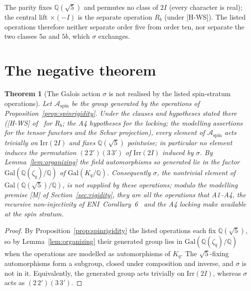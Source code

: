 \documentclass[11pt]{article}
\newtheorem{theorem}{Theorem}
\theoremstyle{definition}
\theoremstyle{remark}
\newcommand{\Gal}{\mathrm{Gal}}
\begin{document}
    The parity fixes $\mathbb{Q}(\sqrt{5})$ and permutes no class of $2I$ (every character is real); the central lift
    $\times(-I)$ is the separate operation $R_b$ (under [H-WS]).
    The listed operations therefore neither separate order five from order ten, nor separate the two classes $5a$ and $5b$, which
    $\sigma$ exchanges.

  \section{The negative theorem}
    \label{sec:negative}

    \begin{theorem}[The Galois action $\sigma$ is not realised by the listed spin-stratum operations]
      \label{thm:negative}
      Let $\mathcal{A}_{\mathrm{spin}}$ be the group generated by the operations of
      Proposition~\ref{prop:spinrigidity}.
      Under the clauses and hypotheses stated there ([H-WS] of~\cite{Beau2026q11of} for $R_b$; the A4 hypotheses for the
      locking; the modelling assertions for the tensor functors and the Schur projection), every element of
      $\mathcal{A}_{\mathrm{spin}}$ acts trivially on $\mathrm{Irr}(2I)$ and fixes $\mathbb{Q}(\sqrt{5})$ pointwise; in
      particular no element induces the permutation $(2\,2')(3\,3')$ of $\mathrm{Irr}(2I)$ induced by $\sigma$.
      By Lemma~\ref{lem:organizing} the field automorphisms so generated lie in the factor
      $\Gal(\mathbb{Q}(\zeta_q)/\mathbb{Q})$ of $\Gal(K_q/\mathbb{Q})$.
      Consequently $\sigma$, the nontrivial element of $\Gal(\mathbb{Q}(\sqrt{5})/\mathbb{Q})$, is not supplied by these
      operations; modulo the modelling premise [M] of Section~\ref{sec:rigidity}, they are all the operations that
      A1--A4, the recursive non-injectivity of ENI~Corollary~6~\cite{Beau2026l} and the A4 locking make available at
      the spin stratum.
    \end{theorem}

    \begin{proof}
      By Proposition~\ref{prop:spinrigidity} the listed operations each fix $\mathbb{Q}(\sqrt{5})$, so by
      Lemma~\ref{lem:organizing} their generated group lies in $\Gal(\mathbb{Q}(\zeta_q)/\mathbb{Q})$ when the operations
      are modelled as automorphisms of $K_q$.
      The $\sqrt{5}$-fixing automorphisms form a subgroup, closed under composition and inverse, and $\sigma$ is not in it.
      Equivalently, the generated group acts trivially on $\mathrm{Irr}(2I)$, whereas $\sigma$ acts as $(2\,2')(3\,3')$.
    \end{proof}
\end{document}

